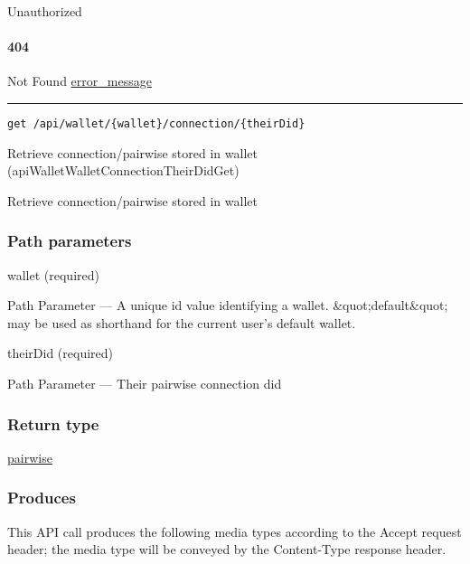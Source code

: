 Unauthorized \protect\hyperlink{}{}

\hypertarget{section-49}{%
\paragraph{404}\label{section-49}}

Not Found \protect\hyperlink{error_message}{error\_message}

\begin{center}\rule{0.5\linewidth}{\linethickness}\end{center}

\protect\hypertarget{apiWalletWalletConnectionTheirDidGet}{}{}

\begin{verbatim}
get /api/wallet/{wallet}/connection/{theirDid}
\end{verbatim}

Retrieve connection/pairwise stored in wallet
({apiWalletWalletConnectionTheirDidGet})

Retrieve connection/pairwise stored in wallet

\hypertarget{path-parameters-8}{%
\subsubsection{Path parameters}\label{path-parameters-8}}

wallet (required)

{Path Parameter} --- A unique id value identifying a wallet.
\&quot;default\&quot; may be used as shorthand for the current user's
default wallet.

theirDid (required)

{Path Parameter} --- Their pairwise connection did

\hypertarget{return-type-12}{%
\subsubsection{Return type}\label{return-type-12}}

\protect\hyperlink{pairwise}{pairwise}

\hypertarget{produces-15}{%
\subsubsection{Produces}\label{produces-15}}

This API call produces the following media types according to the
{Accept} request header; the media type will be conveyed by the
{Content-Type} response header.

